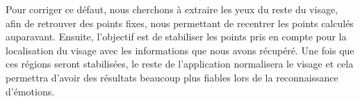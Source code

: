 Pour corriger ce défaut, nous cherchons à extraire les yeux du reste du visage, afin 
de retrouver des points fixes, nous permettant de recentrer les points calculés auparavant.
Ensuite, l'objectif est de stabiliser les points pris en compte pour la localisation du visage avec les informations que
nous avons récupéré.  Une fois que ces
régions seront stabilisées, le reste de l'application normalisera le
visage et cela permettra d'avoir des résultats beaucoup plus fiables lors de la
reconnaissance d'émotions.\\

% 
% 
% 
\newpage
